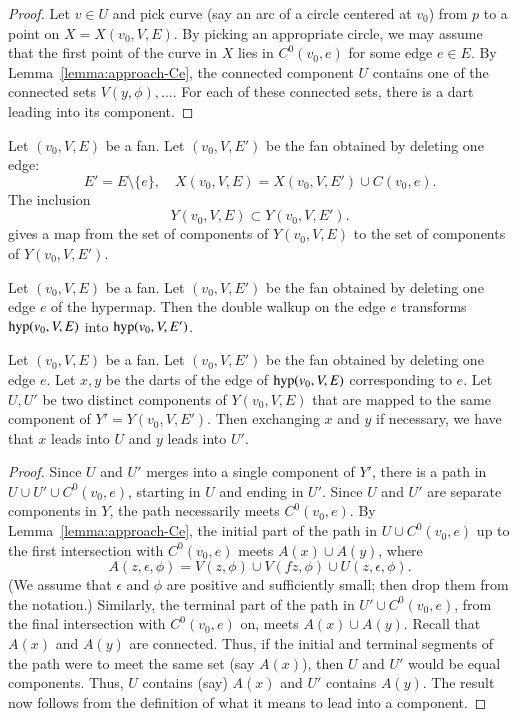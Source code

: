 \begin{proof}  Let $v\in U$ and pick curve (say an arc of a
circle centered at $v_0$) from $p$ to a point on $X=X(v_0,V,E)$.
By picking an appropriate circle, 
we may assume that the first point of the curve in $X$ lies
in $C^0(v_0,e)$ for some edge $e\in E$.  
By Lemma~\ref{lemma:approach-Ce},
the connected component $U$ contains one of the connected
sets $V(y,\phi),\ldots$.
For each of these connected sets, there is a dart leading
into its component.
\end{proof}

\begin{lemma}
Let $(v_0,V,E)$ be a fan.  Let $(v_0,V,E')$
be the fan obtained by deleting one edge:
  $$
  E' = E\setminus\{e\}, \quad X(v_0,V,E) = X(v_0,V,E')\cup C(v_0,e).
  $$
The inclusion  $$Y(v_0,V,E) \subset Y(v_0,V,E').
   $$
gives a map
from the set of components
of $Y(v_0,V,E)$ to the set of components
of $Y(v_0,V,E')$.
\end{lemma}

\begin{lemma}\label{lemma:pre-walkup}
Let $(v_0,V,E)$ be a fan.  Let $(v_0,V,E')$
be the fan obtained by deleting one edge $e$
of the hypermap.
Then the double walkup on the edge $e$
transforms ${\operatorname{hyp}}(v_0,V,E)$ into
${\operatorname{hyp}}(v_0,V,E')$.
\end{lemma}


\begin{lemma}\label{lemma:join-comp}
Let $(v_0,V,E)$ be a fan.  Let $(v_0,V,E')$
be the fan obtained by deleting one edge $e$.
Let $x,y$ be the darts of the edge of
${\operatorname{hyp}}(v_0,V,E)$ corresponding
to $e$.
Let $U,U'$ be two distinct
components of $Y(v_0,V,E)$ that are mapped
to the same component of $Y'=Y(v_0,V,E')$.  Then exchanging
$x$ and $y$ if necessary, we have that $x$ leads into $U$
and $y$ leads into $U'$.
\end{lemma}

\begin{proof}
Since $U$ and $U'$ merges into a single component of $Y'$,
there is a path in $U\cup U'\cup C^0(v_0,e)$, starting in $U$
and ending in $U'$.  Since $U$ and $U'$ are separate components
in $Y$, the path necessarily meets $C^0(v_0,e)$.
By Lemma~\ref{lemma:approach-Ce}, the
initial part of the path in $U\cup C^0(v_0,e)$ up to the first
intersection with $C^0(v_0,e)$ meets $A(x)\cup A(y)$, where
  $$
  A(z,\epsilon,\phi) = 
    V(z,\phi) \cup V(f z,\phi) 
  \cup U(z,\epsilon,\phi).
  $$
(We assume that $\epsilon$ and $\phi$ are positive and sufficiently
small; then drop them from the notation.)
Similarly, the terminal part of the path in $U'\cup C^0(v_0,e)$, 
from the
final intersection with $C^0(v_0,e)$ on, meets $A(x)\cup A(y)$.
Recall that $A(x)$ and $A(y)$ are connected.  Thus,
if the initial and terminal segments of the path were to
meet the
same set (say $A(x)$), then $U$ and $U'$ would be equal components.
Thus, $U$ contains (say) $A(x)$ and $U'$ contains $A(y)$.
The result now follows from the definition of what it means
to lead into a component.
\end{proof}


